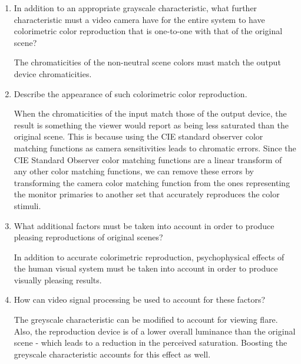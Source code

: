 \documentclass{amsart}
\theoremstyle{definition}
\theoremstyle{remark}
\numberwithin{equation}{section}
\begin{document}
\begin{enumerate}
\item  In addition to an appropriate grayscale characteristic,
what further characteristic must a video camera have for the
entire system to have colorimetric color reproduction that is
one-to-one with that of the original scene?
\newline
\par The chromaticities of the non-neutral scene colors must match
the output device chromaticities.
\newline
\item Describe the appearance of such colorimetric color
reproduction.
\newline
\par When the chromaticities of the input match those of the output
device, the result is something the viewer would report as being
less saturated than the original scene. This is because using the
CIE standard observer color matching functions as camera
sensitivities leads to chromatic errors. Since the CIE Standard
Observer color matching functions are a linear transform of any
other color matching functions, we can remove these errors by
transforming the camera color matching function from the ones
representing the monitor primaries to another set that accurately
reproduces the color stimuli.
\newline

 \item  What additional factors must be taken into
account in order to produce pleasing reproductions of original
scenes?
\newline
\par In addition to accurate colorimetric reproduction,
psychophysical effects of the human visual system must be taken
into account in order to produce visually pleasing results.
\newline

\item  How can video signal processing be used to account for
these factors?
\newline
\par The greyscale characteristic can be modified to account for
viewing flare.  Also, the reproduction device is of a lower
overall luminance than the original scene - which leads to a
reduction in the perceived saturation.  Boosting the greyscale
characteristic accounts for this effect as well.
\newline


\end{enumerate}
\end{document}
